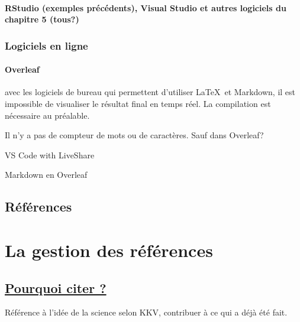 \documentclass[
  letterpaper,
]{scrbook}
\begin{document}
\hypertarget{rstudio-exemples-pruxe9cuxe9dents-visual-studio-et-autres-logiciels-du-chapitre-5-tous}{%
\subsubsection{RStudio (exemples précédents), Visual Studio et autres
logiciels du chapitre 5
(tous?)}\label{rstudio-exemples-pruxe9cuxe9dents-visual-studio-et-autres-logiciels-du-chapitre-5-tous}}

\hypertarget{logiciels-en-ligne}{%
\subsection{Logiciels en ligne}\label{logiciels-en-ligne}}

\hypertarget{overleaf}{%
\subsubsection{Overleaf}\label{overleaf}}

avec les logiciels de bureau qui permettent d'utiliser \LaTeX~et
Markdown, il est impossible de visualiser le résultat final en temps
réel. La compilation est nécessaire au préalable.

Il n'y a pas de compteur de mots ou de caractères. Sauf dans Overleaf?

VS Code with LiveShare

Markdown en Overleaf

\hypertarget{ruxe9fuxe9rences}{%
\section{Références}\label{ruxe9fuxe9rences}}


\hypertarget{sec-chap6}{%
\chapter{La gestion des références}\label{sec-chap6}}

\hypertarget{pourquoi-citer}{%
\section{\texorpdfstring{\ul{Pourquoi citer
?}}{Pourquoi citer ?}}\label{pourquoi-citer}}

Référence à l'idée de la science selon KKV, contribuer à ce qui a déjà
été fait.
\end{document}
